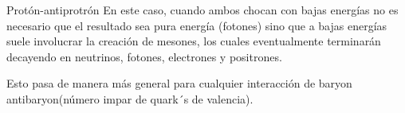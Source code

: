 \documentclass{beamer}
\begin{document}
\begin{frame}{Protón-antiprotrón}
En este caso, cuando ambos chocan con bajas energías no es necesario que el resultado sea pura energía (fotones) sino que a bajas energías suele involucrar la creación de mesones, los cuales eventualmente terminarán decayendo en neutrinos, fotones, electrones y positrones.
\par
Esto pasa de manera más general para cualquier interacción de baryon antibaryon(número impar de quark´s de valencia).
    
\end{frame}
\end{document}
